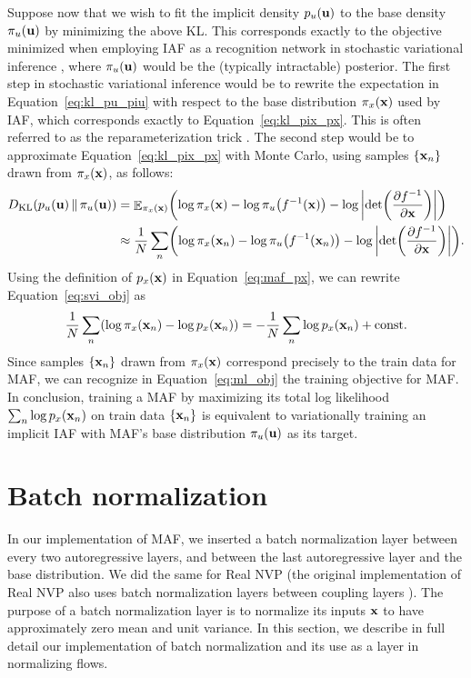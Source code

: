 Suppose now that we wish to fit the implicit density $p_u\br{\vect{u}}$ to the base density $\pi_u\br{\vect{u}}$ by minimizing the above KL\@. This corresponds exactly to the objective minimized when employing IAF as a recognition network in stochastic variational inference \citep{Kingma:2016}, where $\pi_u\br{\vect{u}}$ would be the (typically intractable) posterior. The first step in stochastic variational inference would be to rewrite the expectation in Equation~\eqref{eq:kl_pu_piu} with respect to the base distribution $\pi_x\br{\vect{x}}$ used by IAF\@, which corresponds exactly to Equation~\eqref{eq:kl_pix_px}. This is often referred to as the reparameterization trick \citep{Kingma:2014, Rezende:2014}. The second step would be to approximate Equation~\eqref{eq:kl_pix_px} with Monte Carlo, using samples $\set{\vect{x}_n}$ drawn from $\pi_x\br{\vect{x}}$, as follows:
\begin{align}
\kl{p_u\br{\vect{u}}}{\pi_u\br{\vect{u}}} &= \avg{\log{\pi_x\br{\vect{x}}}-\log{\pi_u\br{f^{-1}\br{\vect{x}}}} - \log{\abs{\det\br{\deriv{f^{-1}}{\vect{x}}}}}}{\pi_x\br{\vect{x}}} \\
&\approx \frac{1}{N}\sum_n\br{\log{\pi_x\br{\vect{x}_n}}-\log{\pi_u\br{f^{-1}\br{\vect{x}_n}}} - \log{\abs{\det\br{\deriv{f^{-1}}{\vect{x}}}}}}.
\label{eq:svi_obj}
\end{align}
Using the definition of $p_x\br{\vect{x}}$ in Equation~\eqref{eq:maf_px}, we can rewrite Equation~\eqref{eq:svi_obj} as
\begin{equation}
\frac{1}{N}\sum_n\br{\log{\pi_x\br{\vect{x}_n}}-\log{p_x\br{\vect{x}_n}}} = 
-\frac{1}{N}\sum_n\log{p_x\br{\vect{x}_n}} + \mathrm{const}.
\label{eq:ml_obj}
\end{equation}
Since samples $\set{\vect{x}_n}$ drawn from $\pi_x\br{\vect{x}}$ correspond precisely to the train data for MAF, we can recognize in Equation~\eqref{eq:ml_obj} the training objective for MAF\@. In conclusion, training a MAF by maximizing its total log likelihood $\sum_n\log{p_x\br{\vect{x}_n}}$ on train data $\set{\vect{x}_n}$ is equivalent to variationally training an implicit IAF with MAF's base distribution $\pi_u\br{\vect{u}}$ as its target.


\section{Batch normalization}
\label{sec:batchnorm}

In our implementation of MAF, we inserted a batch normalization layer \citep{Ioffe:2015} between every two autoregressive layers, and between the last autoregressive layer and the base distribution. We did the same for Real NVP (the original implementation of Real NVP also uses batch normalization layers between coupling layers \citep{Dinh:2017}). The purpose of a batch normalization layer is to normalize its inputs $\vect{x}$ to have approximately zero mean and unit variance. In this section, we describe in full detail our implementation of batch normalization and its use as a layer in normalizing flows.

